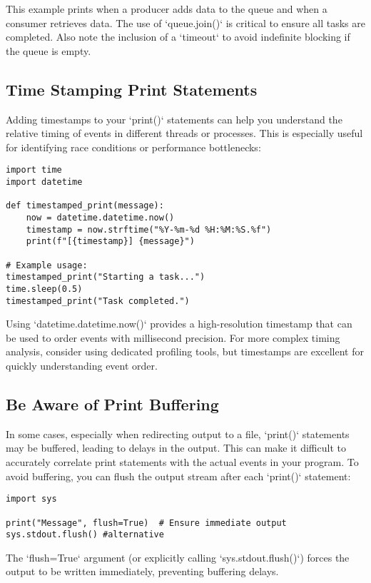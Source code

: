 \documentclass{article}
\begin{document}
{{{This example prints when a producer adds data to the queue and when a consumer retrieves data. The use of `queue.join()` is critical to ensure all tasks are completed.  Also note the inclusion of a `timeout` to avoid indefinite blocking if the queue is empty.

\subsection*{Time Stamping Print Statements}

Adding timestamps to your `print()` statements can help you understand the relative timing of events in different threads or processes. This is especially useful for identifying race conditions or performance bottlenecks:

\begin{verbatim}
import time
import datetime

def timestamped_print(message):
    now = datetime.datetime.now()
    timestamp = now.strftime("%Y-%m-%d %H:%M:%S.%f")
    print(f"[{timestamp}] {message}")

# Example usage:
timestamped_print("Starting a task...")
time.sleep(0.5)
timestamped_print("Task completed.")
\end{verbatim}

Using `datetime.datetime.now()` provides a high-resolution timestamp that can be used to order events with millisecond precision.  For more complex timing analysis, consider using dedicated profiling tools, but timestamps are excellent for quickly understanding event order.

\subsection*{Be Aware of Print Buffering}

In some cases, especially when redirecting output to a file, `print()` statements may be buffered, leading to delays in the output. This can make it difficult to accurately correlate print statements with the actual events in your program. To avoid buffering, you can flush the output stream after each `print()` statement:

\begin{verbatim}
import sys

print("Message", flush=True)  # Ensure immediate output
sys.stdout.flush() #alternative
\end{verbatim}

The `flush=True` argument (or explicitly calling `sys.stdout.flush()`) forces the output to be written immediately, preventing buffering delays.

}}}
\end{document}

